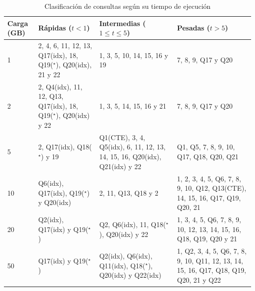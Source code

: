 \documentclass[12pt, letter paper]{report}
\begin{document}
        \begin{table}[H]
          \caption{Clasificación de consultas según su tiempo de ejecución}
          \begin{tabular}{| l | p{4.5cm} | p{4.5cm} | p{4.5cm} |}
            \hline Carga (GB) %
              &                            Rápidas ($t < 1$)                          &                        Intermedias ($1 \le t \le 5$)                       &                                    Pesadas ($t > 5$)                                   \\ \hline
            1 &   2, 4, 6, 11, 12, 13, Q17(idx), 18, Q19($^\star$), Q20(idx), 21 y 22 &                         1, 3, 5, 10, 14, 15, 16 y 19                       &                                   7, 8, 9, Q17 y Q20                                   \\ \hline
            2 &  2, Q4(idx), 11, 12, Q13, Q17(idx), 18, Q19($^\star$), Q20(idx) y 22  &                           1, 3, 5, 14, 15, 16 y 21                         &                                   7, 8, 9, Q17 y Q20                                   \\ \hline
            5 &                     2, Q17(idx), Q18($^\star$) y 19                   & Q1(CTE), 3, 4, Q5(idx), 6, 11, 12, 13, 14, 15, 16, Q20(idx), Q21(idx) y 22 &                         Q1, Q5, 7, 8, 9, 10, Q17, Q18, Q20, Q21                        \\ \hline
           10 &               Q6(idx), Q17(idx), Q19($^\star$) y Q20(idx)             &                            2, 11, Q13, Q18 y 2                             &       1, 2, 3, 4, 5, Q6, 7, 8, 9, 10, Q12, Q13(CTE), 14, 15, 16, Q17, Q19, Q20, 21     \\ \hline
           20 &                     Q2(idx), Q17(idx) y Q19($^\star$)                 &                Q2, Q6(idx), 11, Q18($^\star$), Q20(idx) y 22               &           1, 3, 4, 5, Q6, 7, 8, 9, 10, 12, 13, 14, 15, 16, Q18, Q19, Q20 y 21          \\ \hline
           50 &                        Q17(idx) y Q19($^\star$)                       &       Q2(idx), Q6(idx), Q11(idx), Q18($^\star$), Q20(idx) y Q22(idx)       & 1, Q2, 3, 4, 5, Q6, 7, 8, 9, 10, Q11, 12, 13, 14, 15, 16, Q17, Q18, Q19, Q20, 21 y Q22 \\ \hline
          \end{tabular}
          \label{tab:consultasPorTiempo}
        \end{table}
\end{document}
